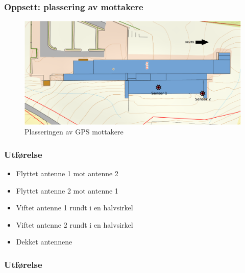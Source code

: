 \documentclass[xcolor=table]{beamer}
\begin{document}
\begin{frame}
\frametitle{Oppsett: plassering av mottakere}
      \begin{figure}
        \includegraphics[scale=0.18]{thesis/graphics/roof.eps}
        \caption{Plasseringen av GPS mottakere}
      \end{figure}
\end{frame}

\begin{frame}
\frametitle{Utførelse}
      \begin{itemize}
        \item Flyttet antenne 1 mot antenne 2
        \item Flyttet antenne 2 mot antenne 1
        \item Viftet antenne 1 rundt i en halvsirkel
        \item Viftet antenne 2 rundt i en halvsirkel
        \item Dekket antennene
      \end{itemize}
\end{frame}

\begin{frame}
\frametitle{Utførelse}
\begin{center}
\end{center}
\end{frame}
\end{document}
